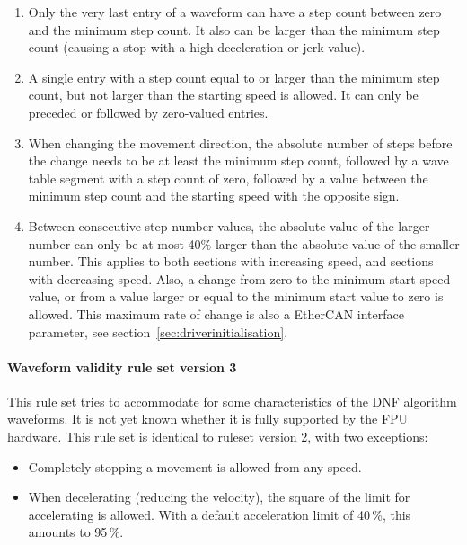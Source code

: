 \documentclass[fontsize=12,a4paper]{scrreprt}
\begin{document}
\begin{enumerate}
\item Only the very last entry of a waveform can have a step count
  between zero and the minimum step count. It also can be larger than
  the minimum step count (causing a stop with a high deceleration or
  jerk value).

\item A single entry with a step count equal to or larger than the
  minimum step count, but not larger than the starting speed is
  allowed. It can only be preceded or followed by zero-valued entries.

\item When changing the movement direction, the absolute number of
  steps before the change needs to be at least the minimum step count,
  followed by a wave table segment with a step count of zero, followed
  by a value between the minimum step count and the starting speed
  with the opposite sign.

\item Between consecutive step number values, the absolute value of
  the larger number can only be at most 40\% larger than the absolute
  value of the smaller number. This applies to both sections with
  increasing speed, and sections with decreasing speed. Also, a change
  from zero to the minimum start speed value, or from a value larger
  or equal to the minimum start value to zero is allowed. This maximum
  rate of change is also a EtherCAN interface parameter, see
  section~\ref{sec:driverinitialisation}.


\end{enumerate}

\paragraph{Waveform validity rule set version 3}

This rule set tries to accommodate for some characteristics of the DNF
algorithm waveforms. It is not yet known whether it is fully supported
by the FPU hardware. This rule set is identical to ruleset version 2,
with two exceptions:

\begin{itemize}
\item Completely stopping a movement is allowed from any speed.
\item When decelerating (reducing the velocity), the square of
  the limit for accelerating is allowed. With a default
  acceleration limit of 40\,\%, this amounts to 95\,\%.
\end{itemize}
\end{document}
